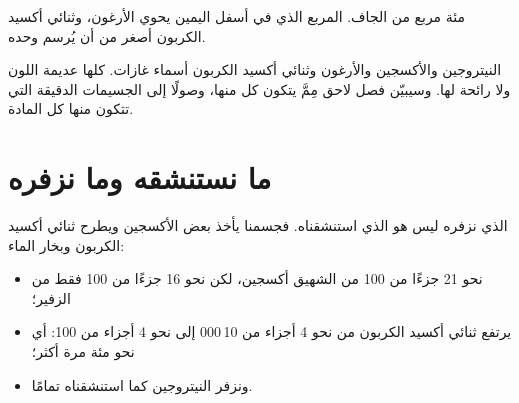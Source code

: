 \begin{omfigure}

{\small مئة مربع من  الجاف. المربع الذي في أسفل اليمين يحوي
الأرغون، وثنائي أكسيد الكربون أصغر من أن يُرسم وحده.}
\end{omfigure}

\begin{remark}\label{rem:g4:air-a-mixture-of-gases:names}
النيتروجين والأكسجين والأرغون وثنائي أكسيد الكربون أسماء غازات. كلها
عديمة اللون ولا رائحة لها. وسيبيّن فصل لاحق مِمَّ يتكون كل منها، وصولًا
إلى الجسيمات الدقيقة التي تتكون منها كل المادة.
\end{remark}

\section{ما نستنشقه وما نزفره}

\begin{proposition}\label{prop:g4:air-a-mixture-of-gases:breath}
 الذي نزفره ليس هو  الذي استنشقناه. فجسمنا يأخذ بعض
الأكسجين ويطرح ثنائي أكسيد الكربون وبخار الماء:
\begin{itemize}
  \item نحو 21 جزءًا من 100 من  الشهيق أكسجين، لكن نحو 16 جزءًا
        من 100 فقط من  الزفير؛
  \item يرتفع ثنائي أكسيد الكربون من نحو 4 أجزاء من 10\,000 إلى نحو 4
        أجزاء من 100: أي نحو مئة مرة أكثر؛
  \item ونزفر النيتروجين كما استنشقناه تمامًا.
\end{itemize}
\end{proposition}

